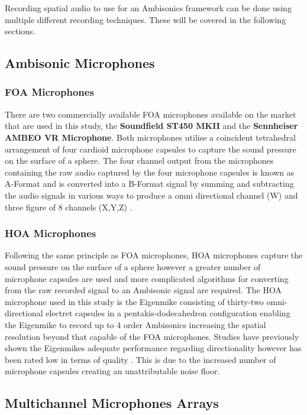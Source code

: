 		Recording spatial audio to use for an Ambisonics framework can be done using multiple different recording techniques. These will be covered in the following sections.


	\subsection{Ambisonic Microphones}

		\subsubsection{FOA Microphones}

			There are two commercially available FOA microphones available on the market that are used in this study, the \textbf{Soundfield ST450 MKII} and the \textbf{Sennheiser AMBEO VR Microphone}. Both microphones utilise a coincident tetrahedral arrangement of four cardioid microphone capsules to capture the sound pressure on the surface of a sphere. The four channel output from the microphones containing the raw audio captured by the four microphone capsules is known as A-Format and is converted into a B-Format signal by summing and subtracting the audio signals in various ways to produce a omni directional channel (W) and three figure of 8 channels (X,Y,Z) \cite{Power}.

		\subsubsection{HOA Microphones}

			Following the same principle as FOA microphones, HOA microphones capture the sound pressure on the surface of a sphere however a greater number of microphone capsules are used and more complicated algorithms for converting from the raw recorded signal to an Ambisonic signal are required. The HOA microphone used in this study is the Eigenmike consisting of thirty-two omni-directional electret capsules in a pentakis-dodecahedron configuration enabling the Eigenmike to record up to 4 order Ambisonics \cite{Bates} increasing the spatial resolution beyond that capable of the FOA microphones. Studies have previously shown the Eigenmikes adequate performance regarding directionality however has been rated low in terms of quality \cite{Bates}. This is due to the increased number of microphone capsules creating an unattributable noise floor.


	\subsection{Multichannel Microphones Arrays} \label{lit:microphones}

